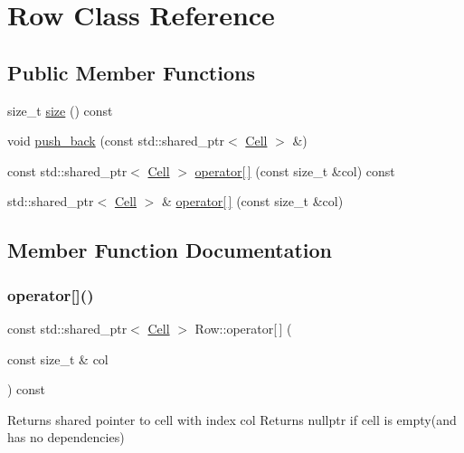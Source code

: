 \hypertarget{classRow}{}\section{Row Class Reference}
\label{classRow}
\subsection*{Public Member Functions}
\begin{DoxyCompactItemize}
\item 
size\+\_\+t \hyperlink{classRow_a17898a404936d1af41aebee87d5bce7a}{size} () const
\item 
void \hyperlink{classRow_a8b22fb69f506e4d7d5c283b5260a1462}{push\+\_\+back} (const std\+::shared\+\_\+ptr$<$ \hyperlink{classCell}{Cell} $>$ \&)
\item 
const std\+::shared\+\_\+ptr$<$ \hyperlink{classCell}{Cell} $>$ \hyperlink{classRow_ace663a04406f7283a1b7a2008dd6d131}{operator\mbox{[}$\,$\mbox{]}} (const size\+\_\+t \&col) const
\item 
std\+::shared\+\_\+ptr$<$ \hyperlink{classCell}{Cell} $>$ \& \hyperlink{classRow_a66a6bfcb670082c16ca936db49705339}{operator\mbox{[}$\,$\mbox{]}} (const size\+\_\+t \&col)
\end{DoxyCompactItemize}


\subsection{Member Function Documentation}
\mbox{\label{classRow_ace663a04406f7283a1b7a2008dd6d131}} 
\subsubsection{\texorpdfstring{operator[]()}{operator[]()}\hspace{0.1cm}{\footnotesize\ttfamily [1/2]}}
{\footnotesize\ttfamily const std\+::shared\+\_\+ptr$<$ \hyperlink{classCell}{Cell} $>$ Row\+::operator\mbox{[}$\,$\mbox{]} (\begin{DoxyParamCaption}\item[{const size\+\_\+t \&}]{col }\end{DoxyParamCaption}) const}

Returns shared pointer to cell with index col Returns nullptr if cell is empty(and has no dependencies) \mbox{\label{classRow_a66a6bfcb670082c16ca936db49705339}} 
